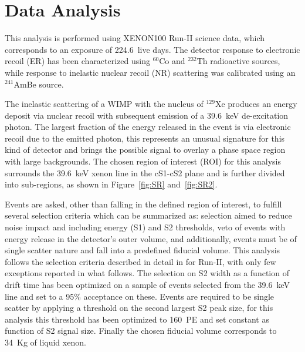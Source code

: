 \section{Data Analysis}
\label{sec:analysis}

This analysis is performed using XENON100 Run-II science data, which corresponds to an exposure of 224.6~live days. The detector response to
electronic recoil (ER) has been characterized using $^{60}$Co and $^{232}$Th radioactive sources, while response to inelastic nuclear recoil (NR)
scattering was calibrated using an $^{241}$AmBe source. 

The inelastic scattering of a WIMP with the nucleus of $^{129}$Xe produces an energy deposit via nuclear recoil with subsequent emission of  
a 39.6~keV de-excitation photon. 
The largest fraction of the energy released in the event is via electronic recoil due to the emitted photon, this represents an
unusual signature for this kind of detector and brings the possible signal to overlay a phase space region with large backgrounds.
The chosen region of interest (ROI) for this analysis surrounds the 39.6~keV xenon line in the cS1-cS2 plane and is further divided into
sub-regions, as shown in Figure~\ref{fig:SR} and~\ref{fig:SR2}.

Events are asked, other than falling in the defined region of interest, to fulfill several selection criteria which can be summarized as:
selection aimed to reduce noise impact and including energy (S1) and S2 thresholds, veto of events with energy release in the detector's outer volume, 
and additionally, events must be of single scatter nature and fall into a predefined fiducial volume. This analysis follows the 
selection criteria described in detail in \cite{dataAnalysis} for Run-II, with only few exceptions reported in what follows. 
The selection on S2 width as a function of drift time has been optimized on a sample of events selected from the 39.6~keV line
and set to a 95\% acceptance on these. Events are required to be single scatter by applying a threshold on the 
second largest S2 peak size,  for this analysis this threshold has been optimized to 160~PE and set constant as function of S2 signal size. 
Finally the chosen fiducial volume corresponds to 34~Kg of liquid xenon.


